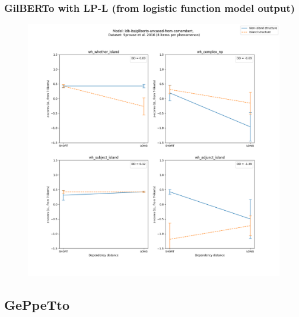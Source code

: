 \subsubsection{GilBERTo with LP-L (from logistic function model output)}
\begin{figure}[h]
	\centering
	\includegraphics[width=1\textwidth]{images/AppendixA/Sprouse_wh_idb-ita_gilberto-uncased-from-camembert_LL-zscores-likert-2022-07-11.png} 
\end{figure}

\clearpage
\subsection{GePpeTto}

